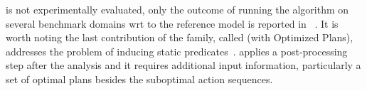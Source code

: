 \LOCMtwo is not experimentally evaluated, only the outcome of running the \LOCMtwo algorithm on several benchmark domains wrt to the reference model is reported in ~\cite{cresswell2011generalised}. It is worth noting the last contribution of the \LOCM family, called \textbf{\LOP} (\LOCM with Optimized Plans), addresses the problem of inducing static predicates~\cite{GregoryC16}. \LOP applies a post-processing step after the \LOCM analysis and it requires additional input information, particularly a set of optimal plans besides the suboptimal \FO action sequences.







